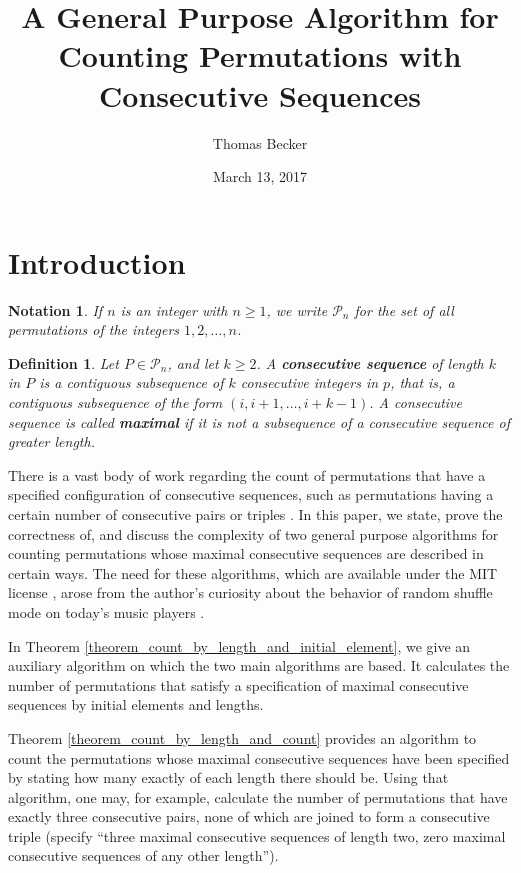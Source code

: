 \documentclass{article}
\newtheorem{definition}[theorem]{Definition}
\newtheorem{notation}[theorem]{Notation}
\begin{document}
\author{Thomas Becker}
\title{A General Purpose Algorithm for Counting Permutations with Consecutive Sequences}
\date{March 13, 2017}
\maketitle

\begin{abstract}
\end{abstract}

\section{Introduction}

\begin{notation}
  If $n$ is an integer with $n \geq 1$, we write ${\mathcal P}_n$ for the set of all permutations of the integers
  $1, 2, \ldots, n$.
\end{notation}

\begin{definition}
  Let $P\in {\mathcal P}_n$, and let $k \geq 2$.
  A {\bf consecutive sequence} of length $k$ in $P$ is a contiguous subsequence of $k$ consecutive
  integers in $p$, that is, a contiguous subsequence of the form $(i, i+1, \ldots, i+k-1)$.
  A consecutive sequence is called {\bf maximal} if it is not a subsequence of a consecutive sequence
  of greater length.
\end{definition}

There is a vast body of work regarding the count of permutations that have a specified configuration of
consecutive sequences, such as permutations having a certain number of consecutive pairs or triples
\cite{OEIS}. In this paper, we state, prove the correctness of, and discuss the complexity of two general
purpose algorithms for
counting permutations whose maximal consecutive sequences are described in certain ways. The need
for these algorithms, which are available under the MIT license \cite{algos}, arose from the author's curiosity
about the behavior of random shuffle mode on today's music players \cite{blog_post}.

In Theorem \ref{theorem_count_by_length_and_initial_element}, we give an auxiliary algorithm on which the
two main algorithms are based. It calculates the number of permutations that satisfy a specification of
maximal consecutive sequences by initial elements and lengths.

Theorem \ref{theorem_count_by_length_and_count}
provides an algorithm to count the permutations whose maximal consecutive sequences have been specified by
stating how many exactly of each length there should be. Using that algorithm, one may, for example,
calculate the number of permutations that have exactly three consecutive pairs, none of which are joined
to form a consecutive triple (specify ``three maximal consecutive sequences of length two, zero maximal
consecutive sequences of any other length'').
\end{document}
